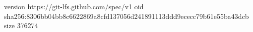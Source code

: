 version https://git-lfs.github.com/spec/v1
oid sha256:8306bb04bb8c6622869a8cfd137056d241891113ddd9ececc79b61e55ba43dcb
size 376274
